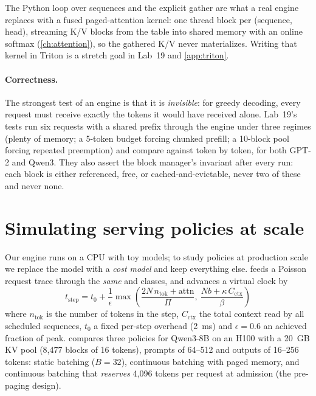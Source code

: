 The Python loop over sequences and the explicit gather are what a real engine replaces with a fused
paged-attention kernel: one thread block per (sequence, head), streaming K/V blocks from the table into
shared memory with an online softmax (\cref{ch:attention}), so the gathered K/V never materializes.
Writing that kernel in Triton is a stretch goal in Lab~19 and \cref{app:triton}.

\paragraph{Correctness.} The strongest test of an engine is that it is \emph{invisible}: for greedy
decoding, every request must receive exactly the tokens it would have received alone. Lab~19's tests
run six requests with a shared prefix through the engine under three regimes (plenty of memory; a
5-token budget forcing chunked prefill; a 10-block pool forcing repeated preemption) and compare against
 token by token, for both GPT-2 and Qwen3. They also assert the block
manager's invariant after every run: each block is either referenced, free, or cached-and-evictable,
never two of these and never none.

\section{Simulating serving policies at scale}\label{sec:serving:sim}

Our engine runs on a CPU with toy models; to study policies at production scale we replace the model
with a \emph{cost model} and keep everything else.  feeds a Poisson
request trace through the \emph{same}  and  classes, and advances a
virtual clock by
\begin{equation}
  t_{\text{step}} = t_0 + \frac{1}{\epsilon}\max\!\left(\frac{2N\,n_{\text{tok}} + \text{attn}}{\Pi},\ \frac{Nb + \kappa\,C_{\text{ctx}}}{\beta}\right)
\end{equation}
where $n_{\text{tok}}$ is the number of tokens in the step, $C_{\text{ctx}}$ the total context read by all
scheduled sequences, $t_0$ a fixed per-step overhead (\SI{2}{ms}) and $\epsilon=0.6$ an achieved
fraction of peak.  compares three policies for Qwen3-8B on an H100 with a
\SI{20}{GB} KV pool (8,477 blocks of 16 tokens), prompts of 64--512 and outputs of 16--256 tokens:
static batching ($B=32$), continuous batching with paged memory, and continuous batching that
\emph{reserves} 4,096 tokens per request at admission (the pre-paging design).

